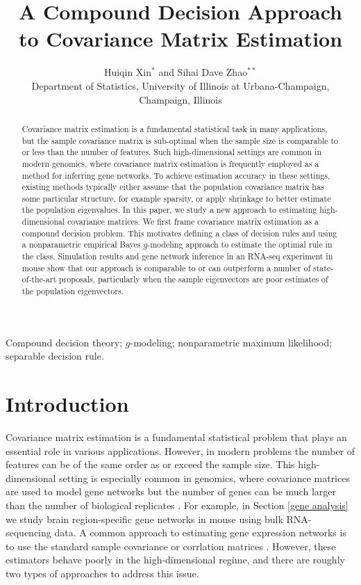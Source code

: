 \documentclass[useAMS,referee,usenatbib]{biom}
\title[Coumpound Decision Covariance Matrix Estimation]{A Compound Decision Approach to Covariance Matrix Estimation}
\author{Huiqin Xin$^{*}$\email{huiqinx2@illinois.edu } and
Sihai Dave Zhao$^{**}$\email{sdzhao@illinois.edu} \\
Department of Statistics, University of Illinois at Urbana-Champaign, Champaign, Illinois}
\begin{document}

\label{firstpage}
\begin{abstract}
  Covariance matrix estimation is a fundamental statistical task in many applications, but the sample covariance matrix is sub-optimal when the sample size is comparable to or less than the number of features. Such high-dimensional settings are common in modern genomics, where covariance matrix estimation is frequently employed as a method for inferring gene networks. To achieve estimation accuracy in these settings, existing methods typically either assume that the population covariance matrix has some particular structure, for example sparsity, or apply shrinkage to better estimate the population eigenvalues. In this paper, we study a new approach to estimating high-dimensional covariance matrices. We first frame covariance matrix estimation as a compound decision problem. This motivates defining a class of decision rules and using a nonparametric empirical Bayes $g$-modeling approach to estimate the optimal rule in the class. Simulation results and gene network inference in an RNA-seq experiment in mouse show that our approach is comparable to or can outperform a number of state-of-the-art proposals, particularly when the sample eigenvectors are poor estimates of the population eigenvectors.
\end{abstract}

\begin{keywords}
Compound decision theory; $g$-modeling; nonparametric maximum likelihood; separable decision rule.
\end{keywords}

\maketitle

\section{Introduction}
\label{introduction}

Covariance matrix estimation is a fundamental statistical problem that plays an essential role in various applications. However, in modern problems the number of features can be of the same order as or exceed the sample size. This high-dimensional setting is especially common in genomics, where covariance matrices are used to model gene networks but the number of genes can be much larger than the number of biological replicates \citep{schafer2005shrinkage, markowetz2007inferring}. For example, in Section \ref{gene analysis} we study brain region-specific gene networks in mouse using bulk RNA-sequencing data. A common approach to estimating gene expression networks is to use the standard sample covariance or corrlation matrices \citep{langfelder2008wgcna, zhang2005general}. However, these estimators behave poorly in the high-dimensional regime, and there are roughly two types of approaches to address this issue.
\end{document}
